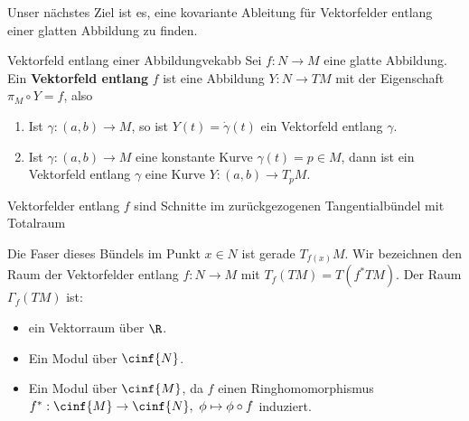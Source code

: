 Unser nächstes Ziel ist es, eine kovariante Ableitung für Vektorfelder entlang einer glatten Abbildung zu finden.
\begin{definition}{Vektorfeld entlang einer Abbildung}{vekabb}
Sei $f: N \to M$ eine glatte Abbildung. Ein \textbf{Vektorfeld entlang} $f$ ist eine Abbildung $Y: N \to TM$ mit der Eigenschaft $\pi_M \circ Y = f$, also
\begin{center}
\end{center}
\end{definition}
\begin{beispiele}
\begin{enumerate}
\item Ist $\gamma: (a,b) \to M$, so ist $Y(t) = \dot{\gamma}(t)$ ein Vektorfeld entlang $\gamma$.
\item Ist $\gamma: (a,b) \to M$ eine konstante Kurve $\gamma(t) = p \in M$, dann ist ein Vektorfeld entlang $\gamma$ eine Kurve $Y: (a,b) \to T_pM$.
\end{enumerate}
\end{beispiele}
\begin{bemerkung}
Vektorfelder entlang $f$ sind Schnitte im zurückgezogenen Tangentialbündel mit Totalraum
\begin{center}
\end{center}
Die Faser dieses Bündels im Punkt $x \in N$ ist gerade $T_{f(x)}M$.
Wir bezeichnen den Raum der Vektorfelder entlang $f: N \to M$ mit $T_f(TM)=T(f^\ast TM)$.
Der Raum $\Gamma_f (TM)$ ist:
\begin{itemize}
\item ein Vektorraum über $\R$.
\item Ein Modul über $\cinf{N}$.
\item Ein Modul über $\cinf{M}$, da $f$ einen Ringhomomorphismus $f^\ast: \cinf{M} \to \cinf{N}, \ \phi \mapsto \phi \circ f$ induziert.
\end{itemize}
\end{bemerkung}
